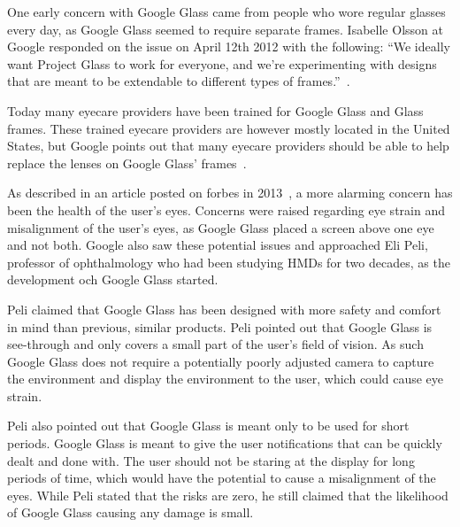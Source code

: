 One early concern with Google Glass came from people who wore regular glasses every day, as Google Glass seemed to require separate frames. Isabelle Olsson at Google responded on the issue on April 12th 2012 with the following: ``We ideally want Project Glass to work for everyone, and we're experimenting with designs that are meant to be extendable to different types of frames.''~\cite{GoogleGlassFrameResponse}.

Today many eyecare providers have been trained for Google Glass and Glass frames. These trained eyecare providers are however mostly located in the United States,\cite{frameProviders} but Google points out that many eyecare providers should be able to help replace the lenses on Google Glass' frames~\cite{framesGlass}.

As described in an article posted on forbes in 2013~\cite{ackerman13}, a more alarming concern has been the health of the user's eyes. Concerns were raised regarding eye strain and misalignment of the user's eyes, as Google Glass placed a screen above one eye and not both. Google also saw these potential issues and approached Eli Peli, professor of ophthalmology who had been studying HMDs for two decades, as the development och Google Glass started.

Peli claimed that Google Glass has been designed with more safety and comfort in mind than previous, similar products. Peli pointed out that Google Glass is see-through and only covers a small part of the user's field of vision. As such Google Glass does not require a potentially poorly adjusted camera to capture the environment and display the environment to the user, which could cause eye strain.

Peli also pointed out that Google Glass is meant only to be used for short periods. Google Glass is meant to give the user notifications that can be quickly dealt and done with. The user should not be staring at the display for long periods of time, which would have the potential to cause a misalignment of the eyes. While Peli stated that the risks are zero, he still claimed that the likelihood of Google Glass causing any damage is small.

